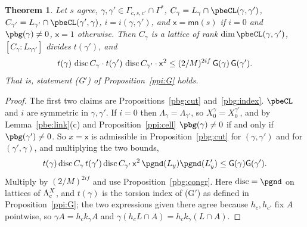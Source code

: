 \documentclass[10pt]{amsart}
\newtheorem{theorem}{Theorem}[section]
\theoremstyle{definition}
\theoremstyle{remark}
\providecommand{\aubar}[1]{\overline{#1}}
\providecommand{\pbR}{\overline R_0}
\begin{document}
\begin{theorem}\label{pbg:main}
Let $s$ agree, $\gamma,\gamma'\in\Gamma_{c,s,c'}\cap\Gamma^*$, $C_\gamma=L_\gamma\cap\pbeCL(\gamma,\gamma')$,
$C_{\gamma'}=L_{\gamma'}\cap\pbeCL(\gamma',\gamma)$, $i=i(\gamma,\gamma')$, and $\mathsf x=\mathsf{mn}(s)$ if
$i=0$ and $\pbg(\gamma)\ne0$, $\mathsf x=1$ otherwise. Then $C_\gamma$ is a lattice of rank $\dim\pbeCL(
\gamma,\gamma')$, $[C_\gamma:L_{\gamma\gamma'}]$ divides $t(\gamma')$, and
\[
t(\gamma)\,\ppidisc C_\gamma\cdot t(\gamma')\,\ppidisc C_{\gamma'}\cdot\mathsf x^2\le(2/M)^{2if}\,\mathsf
G(\gamma)\,\mathsf G(\gamma').
\]
That is, statement \textup{(G$'$)} of Proposition~\ref{ppi:G} holds.
\end{theorem}
\begin{proof}
The first two claims are Propositions~\ref{pbg:cut} and~\ref{pbg:index}. $\pbeCL$ and $i$ are symmetric
in $\gamma,\gamma'$. If $i=0$ then $\Lambda_\gamma=\Lambda_{\gamma'}$, so $X_0^\gamma=X_0^{\gamma'}$, and by
Lemma~\ref{pbe:link}(c) and Proposition~\ref{ppi:cell} $\pbg(\gamma)\ne0$ if and only if $\pbg(\gamma')\ne
0$. So $x=\mathsf x$ is admissible in Proposition~\ref{pbg:cut} for $(\gamma,\gamma')$ and for $(\gamma',
\gamma)$, and multiplying the two bounds,
\[
t(\gamma)\ppidisc C_\gamma\,t(\gamma')\ppidisc C_{\gamma'}\,\mathsf x^2\,\pgnd(L_y)\pgnd(L'_y)\le\mathsf G(
\gamma)\mathsf G(\gamma').
\]
Multiply by $(2/M)^{2if}$ and use Proposition~\ref{pbg:congr}. Here $\ppidisc=\pgnd$ on lattices of
$\ppiLc$, and $t(\gamma)$ is the torsion index of (G$'$) as defined in
Proposition~\ref{ppi:G}; the two expressions given there agree because $h_c,h_{c'}$ fix $A$ pointwise,
so $\gamma A=h_ck_\gamma A$ and $\gamma(h_cL\cap A)=h_ck_\gamma(L\cap A)$.
\end{proof}



\providecommand{\auO}{\mathcal O}
\providecommand{\auNm}{\operatorname{Nm}}
\providecommand{\auA}{\mathbb A}
\providecommand{\aubar}[1]{\overline{#1}}
\providecommand{\auf}[1]{\texttt{#1}}
\providecommand{\pbR}{\overline R_0}
\providecommand{\pbet}{\beta_*}
\providecommand{\pbeGs}{\Gamma^*}
\providecommand{\pbeAp}{A^{+}}
\providecommand{\pbel}{\ell}
\providecommand{\ppiLc}{\Lambda^{X}_{c}}
\providecommand{\ppidisc}{\operatorname{disc}}
\providecommand{\pbcD}{\mathfrak D}
\providecommand{\pbcB}{\mathcal B}
\providecommand{\pbcadj}{\operatorname{adj}}
\providecommand{\pbcspan}{\operatorname{span}}
\providecommand{\pbcrd}{\mathrm{rd}_E}
\providecommand{\pbcHom}{\operatorname{Hom}}
\end{document}
